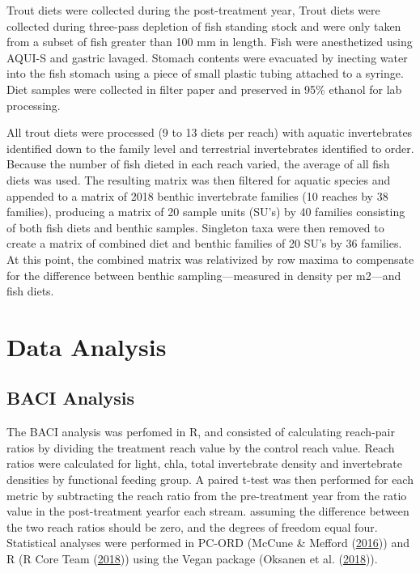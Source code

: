 \documentclass[double,12pt]{beavtex}
\begin{document}
  Trout diets were collected during the post-treatment year, Trout diets
  were collected during three-pass depletion of fish standing stock and
  were only taken from a subset of fish greater than 100 mm in length.
  Fish were anesthetized using AQUI-S and gastric lavaged. Stomach
  contents were evacuated by inecting water into the fish stomach using a
  piece of small plastic tubing attached to a syringe. Diet samples were
  collected in filter paper and preserved in 95\% ethanol for lab
  processing.
  
  All trout diets were processed (9 to 13 diets per reach) with aquatic
  invertebrates identified down to the family level and terrestrial
  invertebrates identified to order. Because the number of fish dieted in
  each reach varied, the average of all fish diets was used. The resulting
  matrix was then filtered for aquatic species and appended to a matrix of
  2018 benthic invertebrate families (10 reaches by 38 families),
  producing a matrix of 20 sample units (SU's) by 40 families consisting
  of both fish diets and benthic samples. Singleton taxa were then removed
  to create a matrix of combined diet and benthic families of 20 SU's by
  36 families. At this point, the combined matrix was relativized by row
  maxima to compensate for the difference between benthic
  sampling---measured in density per m2---and fish diets.
  
  \section*{Data Analysis}\label{data-analysis}
  
  \subsection*{BACI Analysis}\label{baci-analysis}
  
  The BACI analysis was perfomed in R, and consisted of calculating
  reach-pair ratios by dividing the treatment reach value by the control
  reach value. Reach ratios were calculated for light, chla, total
  invertebrate density and invertebrate densities by functional feeding
  group. A paired t-test was then performed for each metric by subtracting
  the reach ratio from the pre-treatment year from the ratio value in the
  post-treatment yearfor each stream. assuming the difference between the
  two reach ratios should be zero, and the degrees of freedom equal four.
  Statistical analyses were performed in PC-ORD (McCune \& Mefford
  (\protect\hyperlink{ref-PC-ORD}{2016})) and R (R Core Team
  (\protect\hyperlink{ref-R-base}{2018})) using the Vegan package (Oksanen
  et al. (\protect\hyperlink{ref-vegan}{2018})).
  
\end{document}
